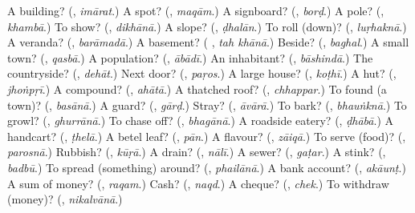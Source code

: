 \begin{tcolorbox}[breakable,colback=teal!4,colframe=teal!35!black,title={Before you move on}]
A building? (\textbf{}, \emph{imārat}.) A spot? (\textbf{}, \emph{maqām}.) A signboard? (\textbf{}, \emph{borḍ}.) A pole? (\textbf{}, \emph{khambā}.) To show? (\textbf{}, \emph{dikhānā}.) A slope? (\textbf{}, \emph{ḍhalān}.) To roll (down)? (\textbf{}, \emph{luṛhaknā}.) A veranda? (\textbf{}, \emph{barāmadā}.) A basement? (\textbf{ }, \emph{tah khānā}.) Beside? (\textbf{}, \emph{baghal}.) A small town? (\textbf{}, \emph{qasbā}.) A population? (\textbf{}, \emph{ābādī}.) An inhabitant? (\textbf{}, \emph{bāshindā}.) The countryside? (\textbf{}, \emph{dehāt}.) Next door? (\textbf{}, \emph{paṛos}.) A large house? (\textbf{}, \emph{koṭhī}.) A hut? (\textbf{}, \emph{jhoṅpṛī}.) A compound? (\textbf{}, \emph{ahātā}.) A thatched roof? (\textbf{}, \emph{chhappar}.) To found (a town)? (\textbf{}, \emph{basānā}.) A guard? (\textbf{}, \emph{gārḍ}.) Stray? (\textbf{}, \emph{āvārā}.) To bark? (\textbf{}, \emph{bhauṅknā}.) To growl? (\textbf{}, \emph{ghurrānā}.) To chase off? (\textbf{}, \emph{bhagānā}.) A roadside eatery? (\textbf{}, \emph{ḍhābā}.) A handcart? (\textbf{}, \emph{ṭhelā}.) A betel leaf? (\textbf{}, \emph{pān}.) A flavour? (\textbf{}, \emph{zāiqā}.) To serve (food)? (\textbf{}, \emph{parosnā}.) Rubbish? (\textbf{}, \emph{kūṛā}.) A drain? (\textbf{}, \emph{nālī}.) A sewer? (\textbf{}, \emph{gaṭar}.) A stink? (\textbf{}, \emph{badbū}.) To spread (something) around? (\textbf{}, \emph{phailānā}.) A bank account? (\textbf{}, \emph{akāunṭ}.) A sum of money? (\textbf{}, \emph{raqam}.) Cash? (\textbf{}, \emph{naqd}.) A cheque? (\textbf{}, \emph{chek}.) To withdraw (money)? (\textbf{}, \emph{nikalvānā}.)
\end{tcolorbox}
